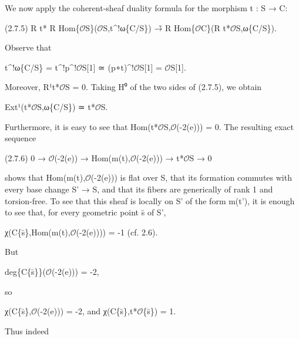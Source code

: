 \documentclass[11pt,a4paper]{article}
\begin{document}
We now apply the coherent-sheaf duality formula for the morphism t : S → C:

(2.7.5)        R t\textunderscore{}* R Hom\textunderscore{}\{\ensuremath{\mathcal{O}}\textunderscore{}S\}(\ensuremath{\mathcal{O}}\textunderscore{}S,t\textasciicircum{}!ω\textunderscore{}\{C/S\}) →̃ R Hom\textunderscore{}\{\ensuremath{\mathcal{O}}\textunderscore{}C\}(R t\textunderscore{}*\ensuremath{\mathcal{O}}\textunderscore{}S,ω\textunderscore{}\{C/S\}).

Observe that

t\textasciicircum{}!ω\textunderscore{}\{C/S\} = t\textasciicircum{}!p\textasciicircum{}!\ensuremath{\mathcal{O}}\textunderscore{}S[1] ≃ (p∘t)\textasciicircum{}!\ensuremath{\mathcal{O}}\textunderscore{}S[1] = \ensuremath{\mathcal{O}}\textunderscore{}S[1].

Moreover, R¹t\textunderscore{}*\ensuremath{\mathcal{O}}\textunderscore{}S = 0. Taking H⁰ of the two sides of (2.7.5), we obtain

Ext¹(t\textunderscore{}*\ensuremath{\mathcal{O}}\textunderscore{}S,ω\textunderscore{}\{C/S\}) ≃ t\textunderscore{}*\ensuremath{\mathcal{O}}\textunderscore{}S.

Furthermore, it is easy to see that Hom(t\textunderscore{}*\ensuremath{\mathcal{O}}\textunderscore{}S,\ensuremath{\mathcal{O}}(-2(e))) = 0. The resulting exact sequence

(2.7.6)        0 → \ensuremath{\mathcal{O}}(-2(e)) → Hom(m(t),\ensuremath{\mathcal{O}}(-2(e))) → t\textunderscore{}*\ensuremath{\mathcal{O}}\textunderscore{}S → 0

shows that Hom(m(t),\ensuremath{\mathcal{O}}(-2(e))) is flat over S, that its formation commutes with every base change S' → S, and that its fibers are generically of rank 1 and torsion-free. To see that this sheaf is locally on S' of the form m(t'), it is enough to see that, for every geometric point s̄ of S',

χ(C\textunderscore{}\{s̄\},Hom(m(t),\ensuremath{\mathcal{O}}(-2(e)))) = -1        (cf. 2.6).

But

deg\textunderscore{}\{C\textunderscore{}\{s̄\}\}(\ensuremath{\mathcal{O}}(-2(e))) = -2,

so

χ(C\textunderscore{}\{s̄\},\ensuremath{\mathcal{O}}(-2(e))) = -2,    and    χ(C\textunderscore{}\{s̄\},t\textunderscore{}*\ensuremath{\mathcal{O}}\textunderscore{}\{s̄\}) = 1.

Thus indeed
\end{document}
